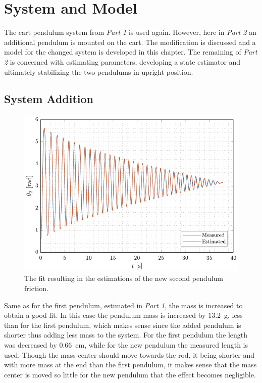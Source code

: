 \chapter{System and Model}
The cart pendulum system from \textit{Part 1} is used again. However, here in \textit{Part 2} an additional pendulum is mounted on the cart. The modification is discussed and a model for the changed system is developed in this chapter. The remaining of \textit{Part 2} is concerned with estimating parameters, developing a state estimator and ultimately stabilizing the two pendulums in upright position.

\section{System Addition}

\begin{figure}[H]
  \includegraphics[width=.7\textwidth]{figures/pendulum2Est}
  \caption{The fit resulting in the estimations of the new second pendulum friction.}
  \label{fig:pendulum2Est}
\end{figure}

Same as for the first pendulum, estimated in \textit{Part 1}, the mass is increased to obtain a good fit. In this case the pendulum mass is increased by \SI{13.2}{g}, less than for the first pendulum, which makes sense since the added pendulum is shorter thus adding less mass to the system. For the first pendulum the length was decreased by \SI{0.66}{cm}, while for the new pendulum the measured length is used. Though the mass center should move towards the rod, it being shorter and with more mass at the end than the first pendulum, it makes sense that the mass center is moved so little for the new pendulum that the effect becomes negligible.

